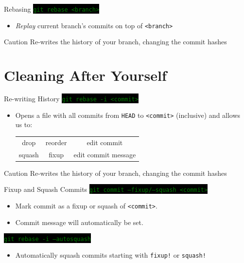 \documentclass[
14pt,
aspectratio=169,
usenames,
dvipsnames,
x11names]{beamer}
\newcommand{\code}[1]{{\small\setlength{\fboxsep}{2pt}\colorbox{black}{\textcolor{green}{\texttt{#1}}}}}
\begin{document}
\begin{frame}{Rebasing}
  \code{git rebase <branch>}
  \begin{itemize}
  \item \textit{Replay} current branch's commits on top of
    \texttt{<branch>}
  \end{itemize}

  \begin{alertblock}{Caution}
    Re-writes the history of your branch, changing the commit hashes
  \end{alertblock}
\end{frame}

\section{Cleaning After Yourself}

\begin{frame}{Re-writing History}
  \code{git rebase -i <commit>}

  \begin{itemize}
  \item Opens a file with all commits from \texttt{HEAD} to
    \texttt{<commit>} (inclusive) and allows us to:
    \begin{center}
      \def\arraystretch{1.5}
      \setlength\tabcolsep{2em}
      \begin{tabular}{c c c}
        drop   & reorder & edit commit \\
        squash & fixup   & edit commit message
      \end{tabular}
    \end{center}
  \end{itemize}

  \begin{alertblock}{Caution}
    Re-writes the history of your branch, changing the commit hashes
  \end{alertblock}
\end{frame}

\begin{frame}{Fixup and Squash Commits}
    \code{git commit --fixup/--squash <commit>}
    \begin{itemize}
    \item Mark commit as a fixup or squash of \texttt{<commit>}.
    \item Commit message will automatically be set.
    \end{itemize}

    \vfill
    \pause

    \code{git rebase -i --autosquash}
    \begin{itemize}
    \item Automatically squash commits starting with \texttt{fixup!} or
      \texttt{squash!}
    \end{itemize}
\end{frame}
\end{document}
